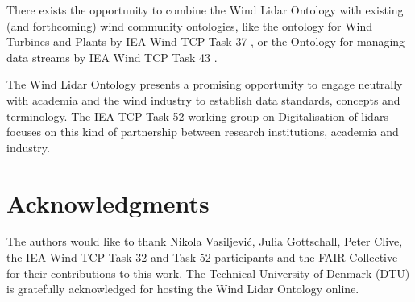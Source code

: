 \documentclass[remotesensing,article,submit,pdftex,moreauthors]{Definitions/mdpi}
\begin{document}
There exists the opportunity to combine the Wind Lidar Ontology with existing (and forthcoming) wind community ontologies, like the ontology  for Wind Turbines and Plants by IEA Wind TCP Task 37 \cite{Task37_web}, or the Ontology for managing data streams by IEA Wind TCP Task 43 \cite{Task43_web}.

The Wind Lidar Ontology presents a promising opportunity to engage neutrally with academia and the wind industry to establish data standards, concepts and terminology. The IEA TCP Task 52 working group on Digitalisation of lidars focuses on this kind of partnership between  research institutions, academia and industry.

\section{Acknowledgments}
The authors would like to thank Nikola Vasiljevi\'{c}, Julia Gottschall, Peter Clive, the IEA Wind TCP Task 32 and Task 52 participants and the FAIR Collective for their contributions to this work.
The Technical University of Denmark (DTU) is gratefully acknowledged for hosting the Wind Lidar Ontology online.

\vspace{6pt} 


\end{document}

